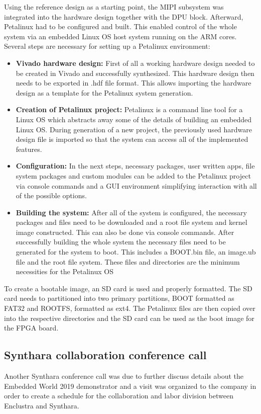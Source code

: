 Using the reference design as a starting point, the \ac{MIPI} subsystem was integrated into the hardware design together with the \ac{DPU} block. Afterward, Petalinux had to be configured and built. This enabled control of the whole system via an embedded Linux \ac{OS} host system running on the ARM cores. Several steps are necessary for setting up a Petalinux environment:
\begin{itemize}
	\item \textbf{Vivado hardware design:} First of all a working hardware design needed to be created in Vivado and successfully synthesized. This hardware design then needs to be exported in .hdf file format. This allows importing the hardware design as a template for the Petalinux system generation.
	\item \textbf{Creation of Petalinux project:} Petalinux is a command line tool for a Linux \ac{OS} which abstracts away some of the details of building an embedded Linux \ac{OS}. During generation of a new project, the previously used hardware design file is imported so that the system can access all of the implemented features.
	\item \textbf{Configuration:} In the next steps, necessary packages, user written apps, file system packages and custom modules can be added to the Petalinux project via console commands and a \ac{GUI} environment simplifying interaction with all of the possible options.
	\item \textbf{Building the system:} After all of the system is configured, the necessary packages and files need to be downloaded and a root file system and kernel image constructed. This can also be done via console commands. After successfully building the whole system the necessary files need to be generated for the system to boot. This includes a BOOT.bin file, an image.ub file and the root file system. These files and directories are the minimum necessities for the Petalinux \ac{OS}
\end{itemize}
To create a bootable image, an SD card is used and properly formatted. The SD card needs to partitioned into two primary partitions, BOOT formatted as FAT32 and ROOTFS, formatted as ext4. The Petalinux files are then copied over into the respective directories and the SD card can be used as the boot image for the \ac{FPGA} board.
\subsection{Synthara collaboration conference call}
Another Synthara conference call was due to further discuss details about the Embedded World 2019 demonstrator and a visit was organized to the company in order to create a schedule for the collaboration and labor division between Enclustra and Synthara.


